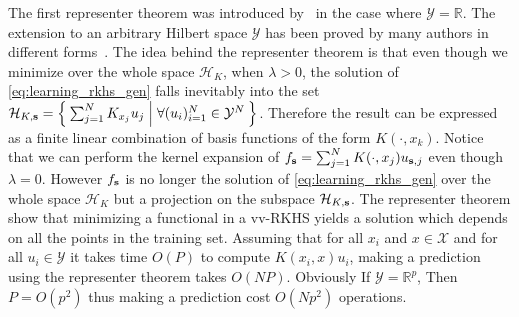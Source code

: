 \documentclass[twoside,11pt]{article}
\begin{document}
The first representer theorem was introduced by~\citet{Wahba90} in the case
where $\mathcal{Y}=\mathbb{R}$. The extension to an arbitrary Hilbert space
$\mathcal{Y}$ has been proved by many authors in different
forms~\citep{Brouard2011,kadri2015operator,Micchelli2005}. The idea behind the
representer theorem is that even though we minimize over the whole space
$\mathcal{H}_K$, when $\lambda>0$, the solution of \cref{eq:learning_rkhs_gen}
falls inevitably into the set $\mathcal{H}_{K,
\boldsymbol{\mathbf{s}}}=\Set{\sum_{j=1}^{N}K_{x_j}u_j| \forall (u_i)_{i=1}^{N}
\in\mathcal{Y}^{N}}$.  Therefore the result can be expressed as a finite linear
combination of basis functions of the form $K(\cdot,x_k)$. Notice that we can
perform the kernel expansion of
$f_{\boldsymbol{\mathbf{s}}}=\sum_{j=1}^{N}K(\cdot,x_j)u_{\boldsymbol{\mathbf{s}},j}$ even though $\lambda=0$.
However $f_{\boldsymbol{\mathbf{s}}}$ is no longer the solution of \cref{eq:learning_rkhs_gen}
over the whole space $\mathcal{H}_K$ but a projection on the subspace
$\mathcal{H}_{K, \boldsymbol{\mathbf{s}}}$.
The representer theorem show that minimizing a functional in a \acs{vv-RKHS}
yields a solution which depends on all the points in the training set. Assuming
that for all $x_i$ and $x\in\mathcal{X}$ and for all $u_i\in\mathcal{Y}$ it
takes time $O(P)$ to compute $K(x_i, x)u_i$, making a prediction using the
representer theorem takes $O(NP)$. Obviously If $\mathcal{Y}=\mathbb{R}^p$,
Then $P=O(p^2)$ thus making a prediction cost $O(Np^2)$ operations.
\end{document}
